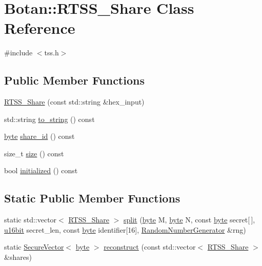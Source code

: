 \hypertarget{classBotan_1_1RTSS__Share}{\section{Botan\-:\-:R\-T\-S\-S\-\_\-\-Share Class Reference}
\label{classBotan_1_1RTSS__Share}
}


{\ttfamily \#include $<$tss.\-h$>$}

\subsection*{Public Member Functions}
\begin{DoxyCompactItemize}
\item 
\hyperlink{classBotan_1_1RTSS__Share_a381bf458fbd946b045ce5b366ffacd96}{R\-T\-S\-S\-\_\-\-Share} (const std\-::string \&hex\-\_\-input)
\item 
std\-::string \hyperlink{classBotan_1_1RTSS__Share_a108dc712afea126fbbb4eec9283fe09b}{to\-\_\-string} () const 
\item 
\hyperlink{namespaceBotan_a7d793989d801281df48c6b19616b8b84}{byte} \hyperlink{classBotan_1_1RTSS__Share_a792ecfcdd84abfd1043893077a04e60a}{share\-\_\-id} () const 
\item 
size\-\_\-t \hyperlink{classBotan_1_1RTSS__Share_a6fe3e2edf94a18975b6521e03984b1d5}{size} () const 
\item 
bool \hyperlink{classBotan_1_1RTSS__Share_ac250bd7b32c6431c67b938f84bbb3dbb}{initialized} () const 
\end{DoxyCompactItemize}
\subsection*{Static Public Member Functions}
\begin{DoxyCompactItemize}
\item 
static std\-::vector$<$ \hyperlink{classBotan_1_1RTSS__Share}{R\-T\-S\-S\-\_\-\-Share} $>$ \hyperlink{classBotan_1_1RTSS__Share_a27a7e27636b70ae495a62c4722da8744}{split} (\hyperlink{namespaceBotan_a7d793989d801281df48c6b19616b8b84}{byte} M, \hyperlink{namespaceBotan_a7d793989d801281df48c6b19616b8b84}{byte} N, const \hyperlink{namespaceBotan_a7d793989d801281df48c6b19616b8b84}{byte} secret\mbox{[}$\,$\mbox{]}, \hyperlink{namespaceBotan_ab07face63a00c39ea6ed97f203ee501c}{u16bit} secret\-\_\-len, const \hyperlink{namespaceBotan_a7d793989d801281df48c6b19616b8b84}{byte} identifier\mbox{[}16\mbox{]}, \hyperlink{classBotan_1_1RandomNumberGenerator}{Random\-Number\-Generator} \&rng)
\item 
static \hyperlink{classBotan_1_1SecureVector}{Secure\-Vector}$<$ \hyperlink{namespaceBotan_a7d793989d801281df48c6b19616b8b84}{byte} $>$ \hyperlink{classBotan_1_1RTSS__Share_aa6319c085dda85c72597ec31a2324599}{reconstruct} (const std\-::vector$<$ \hyperlink{classBotan_1_1RTSS__Share}{R\-T\-S\-S\-\_\-\-Share} $>$ \&shares)
\end{DoxyCompactItemize}


